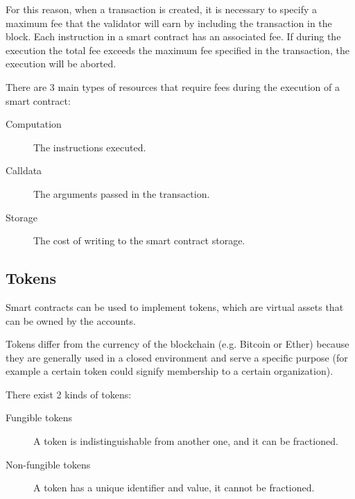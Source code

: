 \documentclass[12pt]{article}
\begin{document}
For this reason, when a transaction is created, it is necessary to specify a maximum fee that the validator will earn by including the transaction in the block.
Each instruction in a smart contract has an associated fee. If during the execution the total fee exceeds the maximum fee specified in the transaction, the execution will be aborted.

There are 3 main types of resources that require fees during the execution of a smart contract:
\begin{description}
    \item[Computation] The instructions executed.
    \item[Calldata] The arguments passed in the transaction.
    \item[Storage] The cost of writing to the smart contract storage.  
\end{description}

\subsection{Tokens} \label{subsection:tokens}
Smart contracts can be used to implement tokens, which are virtual assets that can be owned by the accounts.

Tokens differ from the currency of the blockchain (e.g. Bitcoin or Ether) because they are generally used in a closed environment and serve a specific purpose (for example a certain token could signify membership to a certain organization).

There exist 2 kinds of tokens:
\begin{description}
    \item[Fungible tokens] A token is indistinguishable from another one, and it can be fractioned. 
    \item[Non-fungible tokens] A token has a unique identifier and value, it cannot be fractioned. 
\end{description}
\end{document}
